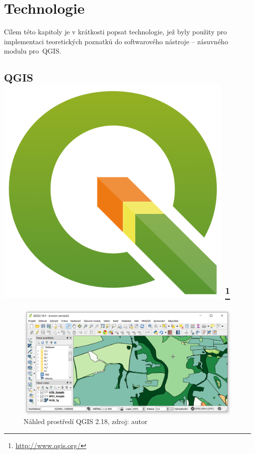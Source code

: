 \chapter{Technologie}
\label{3-technologie}
Cílem této kapitoly je v krátkosti popsat technologie, jež byly
použity pro implementaci teoretických poznatků do softwarového
nástroje – zásuvného modulu pro~QGIS.

\section[QGIS]{QGIS \includegraphics[scale=0.055]{./pictures/qgis.png} 
\footnote{\url{http://www.qgis.org/}}}
\label{qgis}
\begin{figure}[H]
    \centering \includegraphics[scale=0.6]{./pictures/qgis_screen.png}
      \caption[Náhled prostředí QGIS 2.18]
      {Náhled prostředí QGIS 2.18, zdroj: autor}
      \label{screen:qgis}
\end{figure}
